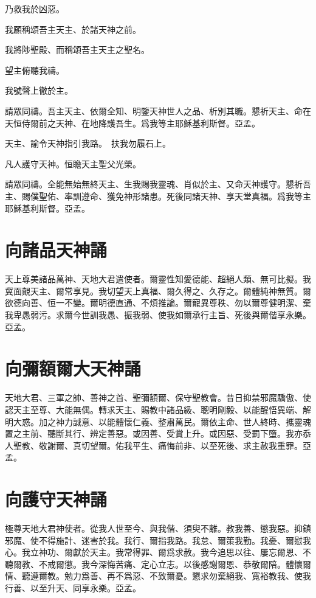 \Response 乃救我於凶惡。

\versicle 我願稱頌吾主天主、於諸天神之前。

\Response 我將陟聖殿、而稱頌吾主天主之聖名。

\versicle 望主俯聽我禱。

\Response 我號聲上徹於主。

\versicle 請眾同禱。{\cspace}吾主天主、依爾全知、明鑒天神世人之品、析別其職。懇祈天主、命在天恒侍爾前之天神、在地降護吾生。爲我等主耶穌基利斯督。{\cspace}亞孟。

\versicle 天主、諭令天神指引我路。　\hfill \response 扶我勿履石上。

\versicle 凡人護守天神。\hfill \response 恒瞻天主聖父光榮。

\versicle 請眾同禱。{\cspace}全能無始無終天主、生我賜我靈魂、肖似於主、又命天神護守。懇祈吾主、賜僕聖佑、率訓遵命、獲免神形諸患。死後同諸天神、享天堂真福。爲我等主耶穌基利斯督。{\cspace}亞孟。

\section*{向諸品天神誦}
天上尊美諸品萬神、天地大君遣使者。爾靈性知愛德能、超絕人類、無可比擬。我冀面覿天主、爾常享見。我切望天上真福、爾久得之、久存之。爾體純神無質。爾欲德向善、恒一不變。爾明德直通、不煩推論。爾寵異尊秩、勿以爾尊健明潔、棄我卑愚弱污。求爾今世訓我愚、振我弱、使我如爾承行主旨、死後與爾偕享永樂。{\cspace}亞孟。

\section*{向彌額爾大天神誦}
天地大君、三軍之帥、善神之首、聖彌額爾、保守聖教會。昔日抑禁邪魔驕傲、使認天主至尊、大能無偶。轉求天主、賜教中諸品級、聰明剛毅、以能醒悟異端、解明大惑。加之神力誠意、以能體懷仁義、整肅萬民。爾依主命、世人終時、攜靈魂置之主前、聽斷其行、辨定善惡。或因善、受賞上升。或因惡、受罰下墮。我亦忝人聖教、敬謝爾、真切望爾。佑我平生、痛悔前非、以至死後、求主赦我重罪。{\cspace}亞孟。

\section*{向護守天神誦}
極尊天地大君神使者。從我人世至今、與我偕、須臾不離。教我善、懲我惡。抑鎮邪魔、使不得施計、迷害於我。我行、爾指我路。我怠、爾策我勤。我憂、爾慰我心。我立神功、爾獻於天主。我常得罪、爾爲求赦。我今追思以往、屢忘爾恩、不聽爾教、不戒爾懲。我今深悔苦痛、定心立志。以後感謝爾恩、恭敬爾陪。體懷爾情、聽遵爾教。勉力爲善、再不爲惡、不致爾憂。懇求勿棄絕我、寬裕教我、使我行善、以至升天、同享永樂。{\cspace}亞孟。
